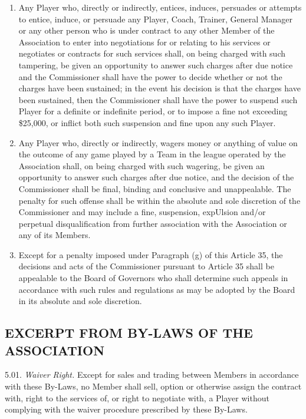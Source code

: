 \documentclass[
]{book}
\begin{document}
\begin{enumerate}
\begin{enumerate}
  \item
    Any Player who, directly or indirectly, entices, induces, persuades or attempts to entice, induce, or persuade any Player, Coach, Trainer, General Manager or any other person who is under contract to any other Member of the Association to enter into negotiations for or relating to his services or negotiates or contracts for such services shall, on being charged with such tampering, be given an opportunity to answer such charges after due notice and the Commissioner shall have the power to decide whether or not the charges have been sustained; in the event his decision is that the charges have been sustained, then the Commissioner shall have the power to suspend such Player for a definite or indefinite period, or to impose a fine not exceeding \$25,000, or inflict both such suspension and fine upon any such Player.
  \item
    Any Player who, directly or indirectly, wagers money or anything of value on the outcome of any game played by a Team in the league operated by the Association shall, on being charged with such wagering, be given an opportunity to answer such charges after due notice, and the decision of the Commissioner shall be final, binding and conclusive and unappealable. The penalty for such offense shall be within the absolute and sole discretion of the Commissioner and may include a fine, suspension, expUlsion and/or perpetual disqualification from further association with the Association or any of its Members.
  \item
    Except for a penalty imposed under Paragraph (g) of this Article 35, the decisions and acts of the Commissioner pursuant to Article 35 shall be appealable to the Board of Governors who shall determine such appeals in accordance with such rules and regulations as may be adopted by the Board in its absolute and sole discretion.
  \end{enumerate}
\end{enumerate}

\newpage

\hypertarget{excerpt-from-by-laws-of-the-association}{%
\subsection{EXCERPT FROM BY-LAWS OF THE ASSOCIATION}\label{excerpt-from-by-laws-of-the-association}}

5.01. \emph{Waiver Right.} Except for sales and trading between Members in accordance with these By-Laws, no Member shall sell, option or otherwise assign the contract with, right to the services of, or right to negotiate with, a Player without complying with the waiver procedure prescribed by these By-Laws.
\end{document}
